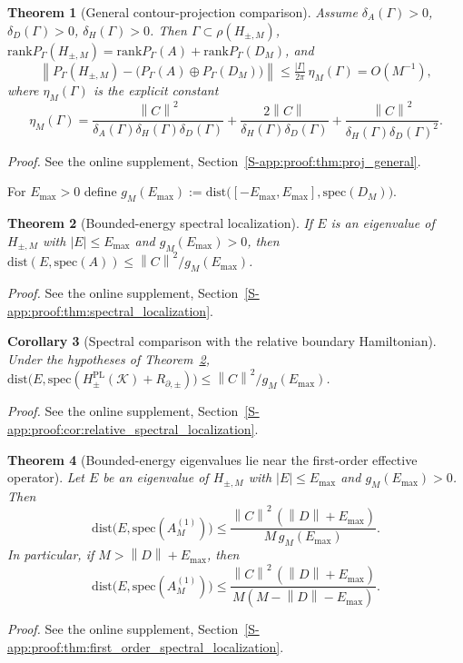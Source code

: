 \documentclass[11pt]{article}
\numberwithin{equation}{section}
\newtheorem{theorem}{Theorem}[section]
\newtheorem{corollary}[theorem]{Corollary}
\theoremstyle{definition}
\theoremstyle{remark}
\newcommand{\proofsuppref}[1]{%
  \par\noindent\emph{Proof.} See the online supplement, Section~\ref{S-#1}.\par\medskip
}
\newcommand{\K}{\mathcal{K}}
\newcommand{\spec}{\mathrm{spec}}
\newcommand{\dist}{\mathrm{dist}}
\newcommand{\rank}{\mathrm{rank}}
\newcommand{\opnorm}[1]{\left\lVert#1\right\rVert}
\begin{document}
\begin{theorem}[General contour-projection comparison]\label{thm:proj_general}
Assume $\delta_A(\Gamma)>0$, $\delta_D(\Gamma)>0$, $\delta_H(\Gamma)>0$. Then
$\Gamma\subset\rho(H_{\pm,M})$,
$\rank P_\Gamma(H_{\pm,M})=\rank P_\Gamma(A)+\rank P_\Gamma(D_M)$, and
\begin{equation}\label{eq:proj_general_bound}
\opnorm{P_\Gamma(H_{\pm,M})-\bigl(P_\Gamma(A)\oplus P_\Gamma(D_M)\bigr)}
\le \tfrac{|\Gamma|}{2\pi}\,\eta_M(\Gamma)=O(M^{-1}),
\end{equation}
where $\eta_M(\Gamma)$ is the explicit constant
\[
\eta_M(\Gamma)
=\frac{\opnorm C^2}{\delta_A(\Gamma)\delta_H(\Gamma)\delta_D(\Gamma)}
+\frac{2\opnorm C}{\delta_H(\Gamma)\delta_D(\Gamma)}
+\frac{\opnorm C^2}{\delta_H(\Gamma)\delta_D(\Gamma)^2}.
\]
\end{theorem}
\proofsuppref{app:proof:thm:proj_general}

For $E_{\max}>0$ define $g_M(E_{\max}):=\dist\bigl([-E_{\max},E_{\max}],\spec(D_M)\bigr)$.

\begin{theorem}[Bounded-energy spectral localization]\label{thm:spectral_localization}
If $E$ is an eigenvalue of $H_{\pm,M}$ with $|E|\le E_{\max}$ and $g_M(E_{\max})>0$, then
$\dist(E,\spec(A))\le\opnorm{C}^2/g_M(E_{\max})$.
\end{theorem}
\proofsuppref{app:proof:thm:spectral_localization}

\begin{corollary}[Spectral comparison with the relative boundary Hamiltonian]\label{cor:relative_spectral_localization}
Under the hypotheses of Theorem~\ref{thm:spectral_localization},
\(\dist\bigl(E,\spec(H^{\mathrm{PL}}_\pm(\K)+R_{\partial,\pm})\bigr)
\le\opnorm{C}^2/g_M(E_{\max})\).
\end{corollary}
\proofsuppref{app:proof:cor:relative_spectral_localization}

\begin{theorem}[Bounded-energy eigenvalues lie near the first-order effective operator]\label{thm:first_order_spectral_localization}
Let $E$ be an eigenvalue of $H_{\pm,M}$ with $|E|\le E_{\max}$ and $g_M(E_{\max})>0$. Then
\begin{equation}\label{eq:specA1_exact}
\dist\bigl(E,\spec(A_M^{(1)})\bigr)
\le
\frac{\opnorm{C}^2\,(\opnorm{D}+E_{\max})}{M\,g_M(E_{\max})}.
\end{equation}
In particular, if $M>\opnorm{D}+E_{\max}$, then
\begin{equation}\label{eq:specA1_crude}
\dist\bigl(E,\spec(A_M^{(1)})\bigr)
\le
\frac{\opnorm{C}^2\,(\opnorm{D}+E_{\max})}{M(M-\opnorm{D}-E_{\max})}.
\end{equation}
\end{theorem}
\proofsuppref{app:proof:thm:first_order_spectral_localization}
\end{document}
